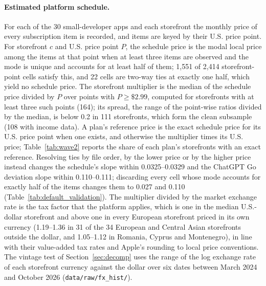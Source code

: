 \documentclass[11pt]{article}
\theoremstyle{definition}
\theoremstyle{remark}
\begin{document}
\paragraph{Estimated platform schedule.} For each of the 30 small-developer apps and each storefront the monthly price of every subscription item is recorded, and items are keyed by their U.S. price point. For storefront $c$ and U.S. price point $P$, the schedule price is the modal local price among the items at that point when at least three items are observed and the mode is unique and accounts for at least half of them; 1,551 of 2,414 storefront-point cells satisfy this, and 22 cells are two-way ties at exactly one half, which yield no schedule price. The storefront multiplier is the median of the schedule price divided by $P$ over points with $P\ge\$2.99$, computed for storefronts with at least three such points (164); its spread, the range of the point-wise ratios divided by the median, is below 0.2 in 111 storefronts, which form the clean subsample (108 with income data). A plan's reference price is the exact schedule price for its U.S. price point when one exists, and otherwise the multiplier times its U.S. price; Table~\ref{tab:wave2} reports the share of each plan's storefronts with an exact reference. Resolving ties by file order, by the lower price or by the higher price instead changes the schedule's slope within 0.0325--0.0329 and the ChatGPT Go deviation slope within 0.110--0.111; discarding every cell whose mode accounts for exactly half of the items changes them to 0.027 and 0.110 (Table~\ref{tab:default_validation}). The multiplier divided by the market exchange rate is the tax factor that the platform applies, which is one in the median U.S.-dollar storefront and above one in every European storefront priced in its own currency (1.19--1.36 in 31 of the 34 European and Central Asian storefronts outside the dollar, and 1.05--1.12 in Romania, Cyprus and Montenegro), in line with their value-added tax rates and Apple's rounding to local price conventions. The vintage test of Section~\ref{sec:decomp} uses the range of the log exchange rate of each storefront currency against the dollar over six dates between March 2024 and October 2026 (\nolinkurl{data/raw/fx_hist/}).
\end{document}
